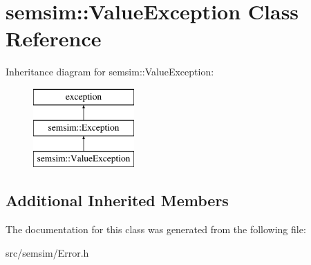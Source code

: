 \hypertarget{classsemsim_1_1ValueException}{}\section{semsim\+:\+:Value\+Exception Class Reference}
\label{classsemsim_1_1ValueException}
Inheritance diagram for semsim\+:\+:Value\+Exception\+:\begin{figure}[H]
\begin{center}
\leavevmode
\includegraphics[height=3.000000cm]{classsemsim_1_1ValueException}
\end{center}
\end{figure}
\subsection*{Additional Inherited Members}


The documentation for this class was generated from the following file\+:\begin{DoxyCompactItemize}
\item 
src/semsim/Error.\+h\end{DoxyCompactItemize}
